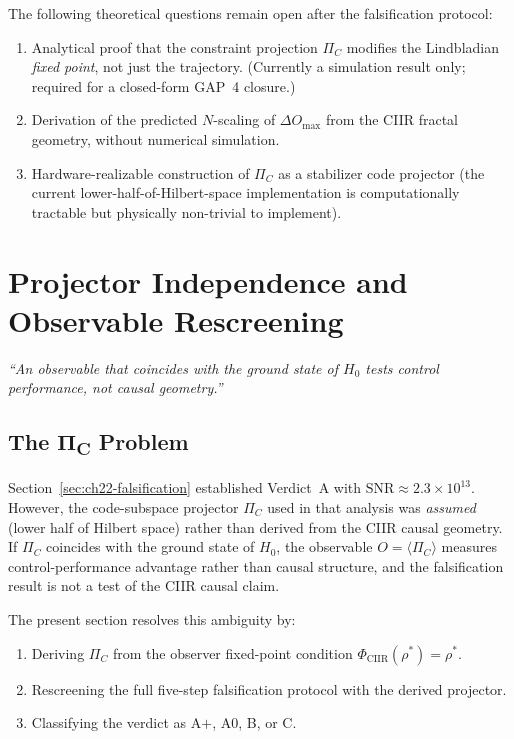 The following theoretical questions remain open after the falsification protocol:
\begin{enumerate}
  \item Analytical proof that the constraint projection $\Pi_C$ modifies
    the Lindbladian \emph{fixed point}, not just the trajectory.  (Currently
    a simulation result only; required for a closed-form GAP~4 closure.)
  \item Derivation of the predicted $N$-scaling of $\Delta O_{\max}$
    from the CIIR fractal geometry, without numerical simulation.
  \item Hardware-realizable construction of $\Pi_C$ as a stabilizer code
    projector (the current lower-half-of-Hilbert-space implementation is
    computationally tractable but physically non-trivial to implement).
\end{enumerate}

\section{Projector Independence and Observable Rescreening}
\label{sec:ch22-projector-independence}

\begin{center}
\textit{%
``An observable that coincides with the ground state of $H_0$ tests
control performance, not causal geometry.''}
\end{center}

\subsection{The Π\textsubscript{C} Problem}

Section~\ref{sec:ch22-falsification} established Verdict~A with
$\mathrm{SNR} \approx 2.3 \times 10^{13}$. However, the code-subspace
projector $\Pi_C$ used in that analysis was \emph{assumed} (lower half of
Hilbert space) rather than derived from the CIIR causal geometry.  If $\Pi_C$
coincides with the ground state of $H_0$, the observable
$O = \langle \Pi_C \rangle$ measures control-performance advantage rather
than causal structure, and the falsification result is not a test of the CIIR
causal claim.

The present section resolves this ambiguity by:
\begin{enumerate}
  \item Deriving $\Pi_C$ from the observer fixed-point condition
    $\Phi_{\mathrm{CIIR}}(\rho^*) = \rho^*$.
  \item Rescreening the full five-step falsification protocol with the
    derived projector.
  \item Classifying the verdict as A$+$, A0, B, or C.
\end{enumerate}

